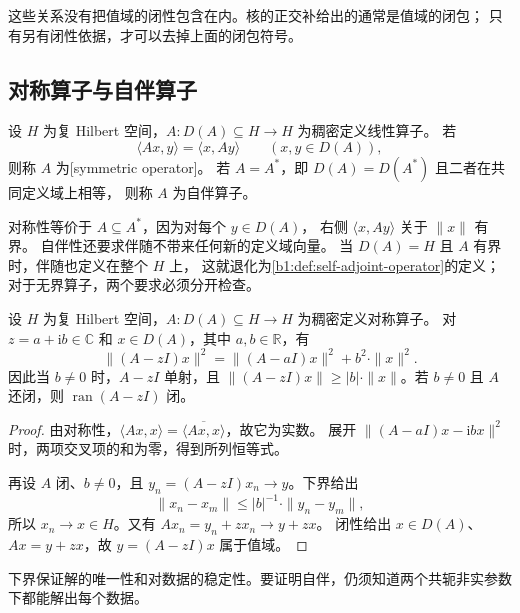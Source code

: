 这些关系没有把值域的闭性包含在内。核的正交补给出的通常是值域的闭包；
只有另有闭性依据，才可以去掉上面的闭包符号。

\subsection{对称算子与自伴算子}
\label{b1:subsec:290503}

\begin{definition}[对称与自伴]
\label{b1:def:29-symmetric-self-adjoint}
设 \(H\) 为复 Hilbert 空间，\(A:D(A)\subseteq H\to H\) 为稠密定义线性算子。
若
\[
 \langle Ax,y\rangle=\langle x,Ay\rangle\qquad(x,y\in D(A)),
\]
则称 \(A\) 为[symmetric operator]。
若 \(A=A^*\)，即 \(D(A)=D(A^*)\) 且二者在共同定义域上相等，
则称 \(A\) 为自伴算子。
\end{definition}

对称性等价于 \(A\subseteq A^*\)，因为对每个 \(y\in D(A)\)，
右侧 \(\langle x,Ay\rangle\) 关于 \(\|x\|\) 有界。
自伴性还要求伴随不带来任何新的定义域向量。
当 \(D(A)=H\) 且 \(A\) 有界时，伴随也定义在整个 \(H\) 上，
这就退化为\cref{b1:def:self-adjoint-operator}的定义；对于无界算子，两个要求必须分开检查。

\begin{lemma}[对称算子的非实参数估计]
\label{b1:lem:29-symmetric-nonreal-bound}
设 \(H\) 为复 Hilbert 空间，\(A:D(A)\subseteq H\to H\) 为稠密定义对称算子。
对 \(z=a+\mathrm ib\in\mathbb C\) 和 \(x\in D(A)\)，其中 \(a,b\in\mathbb R\)，有
\begin{equation}\label{b1:eq:29-symmetric-nonreal-bound}
 \|(A-zI)x\|^2=\|(A-aI)x\|^2+b^2\cdot\|x\|^2.
\end{equation}
因此当 \(b\ne0\) 时，\(A-zI\) 单射，且
\(\|(A-zI)x\|\geq|b|\cdot\|x\|\)。若 \(b\ne0\) 且 \(A\) 还闭，则 \(\operatorname{ran}(A-zI)\) 闭。
\end{lemma}
\begin{proof}
由对称性，\(\langle Ax,x\rangle=\overline{\langle Ax,x\rangle}\)，故它为实数。
展开 \(\|(A-aI)x-\mathrm ibx\|^2\) 时，两项交叉项的和为零，得到所列恒等式。

再设 \(A\) 闭、\(b\ne0\)，且 \(y_n=(A-zI)x_n\to y\)。下界给出
\[
 \|x_n-x_m\|\leq |b|^{-1}\cdot\|y_n-y_m\|,
\]
所以 \(x_n\to x\in H\)。又有 \(Ax_n=y_n+zx_n\to y+zx\)。
闭性给出 \(x\in D(A)\)、\(Ax=y+zx\)，故 \(y=(A-zI)x\) 属于值域。
\end{proof}

下界保证解的唯一性和对数据的稳定性。要证明自伴，仍须知道两个共轭非实参数下都能解出每个数据。

